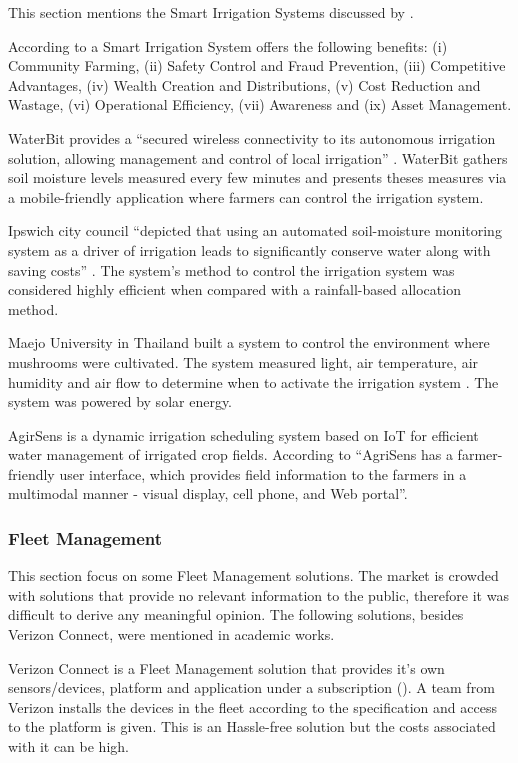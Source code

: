 This section mentions the Smart Irrigation Systems discussed by \cite{OBAIDEEN2022100124}.

According to \cite{8372905} a Smart Irrigation System offers the following benefits: (i) Community Farming, (ii) Safety Control and Fraud Prevention, (iii) Competitive Advantages, (iv) Wealth Creation and Distributions, (v) Cost Reduction and Wastage, (vi) Operational Efficiency, (vii) Awareness and (ix) Asset Management.

WaterBit provides a ``secured wireless connectivity to its autonomous irrigation solution, allowing management and control of local irrigation'' \parencite{OBAIDEEN2022100124}. WaterBit gathers soil moisture levels measured every few minutes and presents theses measures via a mobile-friendly application where farmers can control the irrigation system.

Ipswich city council ``depicted that using an automated soil-moisture monitoring system as a driver of irrigation leads to significantly conserve water along with saving costs'' \parencite{OBAIDEEN2022100124}. The system's method to control the irrigation system was considered highly efficient when compared with a rainfall-based allocation method.

Maejo University in Thailand built a system to control the environment where mushrooms were cultivated. The system measured light, air temperature, air humidity and air flow to determine when to activate the irrigation system \parencite{OBAIDEEN2022100124}. The system was powered by solar energy.

AgirSens is a dynamic irrigation scheduling system based on IoT for efficient water management of irrigated crop fields. According to \cite{9249427} ``AgriSens has a farmer-friendly user interface, which provides field information to the farmers in a multimodal manner - visual display, cell phone, and Web portal''.

\subsubsection{Fleet Management}
\label{subsubsec:stateofart:arch:solutions:fleet}

This section focus on some Fleet Management solutions. The market is crowded with solutions that provide no relevant information to the public, therefore it was difficult to derive any meaningful opinion. The following solutions, besides Verizon Connect, were mentioned in academic works.

Verizon Connect is a Fleet Management solution that provides it's own sensors/devices, platform and application under a subscription (\cite{verizon-iot}).
A team from Verizon installs the devices in the fleet according to the specification and access to the platform is given. This is an Hassle-free solution but the costs associated with it can be high.

